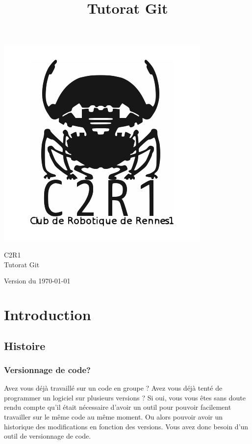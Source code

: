 \documentclass[a4paper,10pt]{article}
\title{Tutorat Git}
\begin{document}
\begin{titlepage}
\vspace{-3cm}\hspace{-2cm}\includegraphics[scale=0.4]{C2R1}
\begin{center}
\vspace{2cm}
{\selectfont
\Large{C2R1}\\
\vspace{0.5cm}
\Huge{Tutorat Git}}\\
\end{center}
\begin{flushright}
 \vfill
{\selectfont
\large{Version du \today}}
\end{flushright}
\end{titlepage}

\pagestyle{fancy}

\section{Introduction}
  \subsection{Histoire}
    \subsubsection{Versionnage de code?}
Avez vous déjà travaillé sur un code en groupe ? Avez vous déjà tenté de programmer un logiciel sur plusieurs versions ? Si oui, vous vous êtes sans doute rendu compte qu'il était nécessaire d'avoir un outil pour pouvoir facilement travailler sur le même code au même moment. Ou alors pouvoir avoir un historique des modifications en fonction des versions. Vous avez donc besoin d'un outil de versionnage de code.
\end{document}
